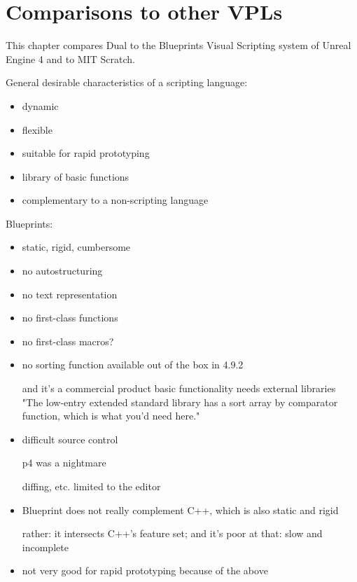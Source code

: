 \chapter{Comparisons to other VPLs}\label{chap:comp}
This chapter compares Dual to the Blueprints Visual Scripting system of Unreal Engine 4 and to MIT Scratch.


General desirable characteristics of a scripting language:
\begin{itemize}
    \item dynamic
    \item flexible
    \item suitable for rapid prototyping
    
    \item library of basic functions
    \item complementary to a non-scripting language
\end{itemize}
    

Blueprints:
\begin{itemize}
    \item static, rigid, cumbersome
    \item no autostructuring
    \item no text representation
    \item no first-class functions
    \item no first-class macros?
    \item no sorting function available out of the box in 4.9.2
    
        and it's a commercial product
        basic functionality needs external libraries
        "The low-entry extended standard library has a sort array by comparator function, which is what you'd need here."
        
    \item  difficult source control
    
    p4 was a nightmare
    
    diffing, etc. limited to the editor
    
    \item  Blueprint does not really complement C++, which is also static and rigid
    
    rather: it intersects C++'s feature set; and it's poor at that: slow and incomplete
    
    \item not very good for rapid prototyping because of the above
\end{itemize}
    
